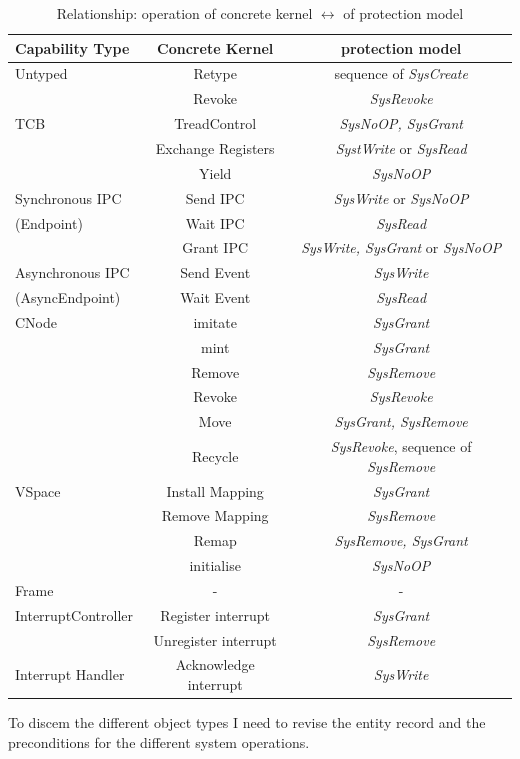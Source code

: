 \documentclass[pdftex,11pt,a4paper,twoside]{article}
\begin{document}
\begin{table}[H]
\begin{tabular}[h]{|l|c|c|}
\hline
Capability Type & Concrete Kernel & protection model \\
\hline
\hline
Untyped & Retype & sequence of \textit{SysCreate} \\
& Revoke & \textit{SysRevoke} \\
\hline
TCB & TreadControl & \textit{SysNoOP, SysGrant} \\
& Exchange Registers & \textit{SystWrite} or \textit{SysRead} \\
& Yield & \textit{SysNoOP} \\
\hline
Synchronous IPC & Send IPC & \textit{SysWrite} or \textit{SysNoOP} \\
(Endpoint) & Wait IPC & \textit{SysRead} \\
& Grant IPC & \textit{SysWrite, SysGrant} or \textit{SysNoOP} \\
\hline
Asynchronous IPC & Send Event & \textit{SysWrite} \\
(AsyncEndpoint) & Wait Event & \textit{SysRead} \\
\hline
CNode & imitate & \textit{SysGrant} \\
& mint & \textit{SysGrant} \\
& Remove & \textit{SysRemove} \\
& Revoke & \textit{SysRevoke} \\
& Move & \textit{SysGrant, SysRemove} \\
& Recycle & \textit{SysRevoke}, sequence of \textit{SysRemove} \\
\hline
VSpace & Install Mapping & \textit{SysGrant} \\
& Remove Mapping & \textit{SysRemove} \\
& Remap & \textit{SysRemove, SysGrant} \\
& initialise & \textit{SysNoOP} \\
\hline
Frame & - & - \\
\hline
InterruptController & Register interrupt & \textit{SysGrant} \\
& Unregister interrupt &  \textit{SysRemove}\\
\hline
Interrupt Handler & Acknowledge interrupt & \textit{SysWrite}\\
\hline
\end{tabular}
\caption{Relationship: operation of concrete kernel $\longleftrightarrow$ of protection model \cite{PhDseL4}}
\end{table}
To discem the different object types I need to revise the entity record and the preconditions for the different system operations. \\ \\ \\
\end{document}
